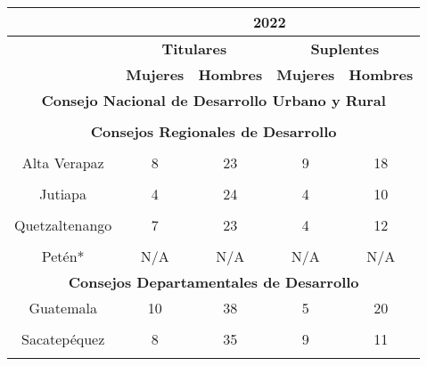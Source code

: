 \begin{tabular}[t]{ccccc}
\toprule
\multicolumn{1}{c}{\textbf{ }} & \multicolumn{4}{c}{\textbf{2022}}\\	
\toprule
\multicolumn{1}{c}{\textbf{ }} & \multicolumn{2}{c}{\textbf{Titulares}} & \multicolumn{2}{c}{\textbf{Suplentes}} \\
\cmidrule(l{3pt}r{3pt}){2-3} \cmidrule(l{3pt}r{3pt}){4-5}
\textbf{} & \textbf{Mujeres} & \textbf{Hombres} & \textbf{Mujeres} & \textbf{Hombres}\\
\midrule
\multicolumn{5}{c}{\color{color3}\textbf{Consejo Nacional de Desarrollo Urbano y Rural}}\\
\midrule
\cellcolor[HTML]{B6B3FF}{ } & \cellcolor[HTML]{B6B3FF}{9} & \cellcolor[HTML]{B6B3FF}{39} & \cellcolor[HTML]{B6B3FF}{10} & \cellcolor[HTML]{B6B3FF}{32}\\
\midrule
\multicolumn{5}{c}{\color{color3}\textbf{Consejos Regionales de Desarrollo}}\\
\midrule
\cellcolor[HTML]{B6B3FF}{Guatemala*} & \cellcolor[HTML]{B6B3FF}{N/A} & \cellcolor[HTML]{B6B3FF}{N/A} & \cellcolor[HTML]{B6B3FF}{N/A} & \cellcolor[HTML]{B6B3FF}{N/A}\\
Alta Verapaz & 8 & 23 & 9 & 18\\
\cellcolor[HTML]{B6B3FF}{Zacapa} & \cellcolor[HTML]{B6B3FF}{11} & \cellcolor[HTML]{B6B3FF}{25} & \cellcolor[HTML]{B6B3FF}{6} & \cellcolor[HTML]{B6B3FF}{20}\\
Jutiapa & 4 & 24 & 4 & 10\\
\cellcolor[HTML]{B6B3FF}{Sacatepéquez} & \cellcolor[HTML]{B6B3FF}{11} & \cellcolor[HTML]{B6B3FF}{25} & \cellcolor[HTML]{B6B3FF}{4} & \cellcolor[HTML]{B6B3FF}{14}\\
Quetzaltenango & 7 & 23 & 4 & 12\\
\cellcolor[HTML]{B6B3FF}{Quiché} & \cellcolor[HTML]{B6B3FF}{5} & \cellcolor[HTML]{B6B3FF}{25} & \cellcolor[HTML]{B6B3FF}{3} & \cellcolor[HTML]{B6B3FF}{13}\\
Petén* & N/A & N/A & N/A & N/A\\
\midrule
\multicolumn{5}{c}{\color{color3}\textbf{Consejos Departamentales de Desarrollo}}\\
\midrule
Guatemala & 10 & 38 & 5 & 20\\
\cellcolor[HTML]{B6B3FF}{El Progreso} & \cellcolor[HTML]{B6B3FF}{4} & \cellcolor[HTML]{B6B3FF}{28} & \cellcolor[HTML]{B6B3FF}{5} & \cellcolor[HTML]{B6B3FF}{11}\\
Sacatepéquez & 8 & 35 & 9 & 11\\
\cellcolor[HTML]{B6B3FF}{Chimaltenango} & \cellcolor[HTML]{B6B3FF}{10} & \cellcolor[HTML]{B6B3FF}{35} & \cellcolor[HTML]{B6B3FF}{11} & \cellcolor[HTML]{B6B3FF}{13}\\

\end{tabular}

